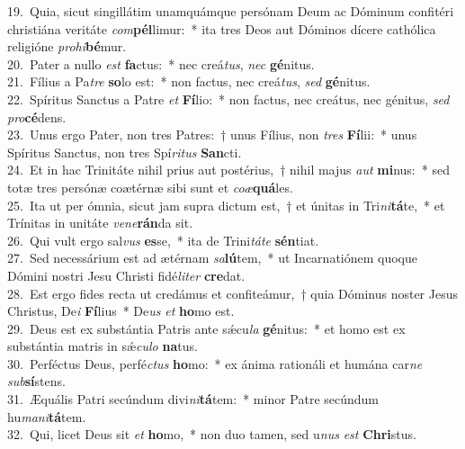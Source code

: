 {19.~}Quia, sicut singillátim unamquámque persónam Deum ac Dóminum confitéri christiána veritáte \textit{com}\textbf{pél}limur:~* ita tres Deos aut Dóminos dícere cathólica religióne \textit{pro}\textit{hi}\textbf{bé}mur.\\
{20.~}Pater a nullo \textit{est} \textbf{fa}ctus:~* nec creá\textit{tus}, \textit{nec} \textbf{gé}nitus.\\
{21.~}Fílius a Pa\textit{tre} \textbf{so}lo est:~* non factus, nec creá\textit{tus}, \textit{sed} \textbf{gé}nitus.\\
{22.~}Spíritus Sanctus a Patre \textit{et} \textbf{Fí}lio:~* non factus, nec creátus, nec génitus, \textit{sed} \textit{pro}\textbf{cé}dens.\\
{23.~}Unus ergo Pater, non tres Patres:~† unus Fílius, non \textit{tres} \textbf{Fí}lii:~* unus Spíritus Sanctus, non tres Spí\textit{ri}\textit{tus} \textbf{San}cti.\\
{24.~}Et in hac Trinitáte nihil prius aut postérius,~† nihil majus \textit{aut} \textbf{mi}nus:~* sed totæ tres persónæ coætérnæ sibi sunt et \textit{co}\textit{æ}\textbf{quá}les.\\
{25.~}Ita ut per ómnia, sicut jam supra dictum est,~† et únitas in Tri\textit{ni}\textbf{tá}te,~* et Trínitas in unitáte \textit{ve}\textit{ne}\textbf{rán}da sit.\\
{26.~}Qui vult ergo sal\textit{vus} \textbf{es}se,~* ita de Trini\textit{tá}\textit{te} \textbf{sén}tiat.\\
{27.~}Sed necessárium est ad ætérnam \textit{sa}\textbf{lú}tem,~* ut Incarnatiónem quoque Dómini nostri Jesu Christi fidé\textit{li}\textit{ter} \textbf{cre}dat.\\
{28.~}Est ergo fides recta ut credámus et confiteámur,~† quia Dóminus noster Jesus Christus, De\textit{i} \textbf{Fí}lius~* De\textit{us} \textit{et} \textbf{ho}mo est.\\
{29.~}Deus est ex substántia Patris ante sǽcu\textit{la} \textbf{gé}nitus:~* et homo est ex substántia matris in sǽ\textit{cu}\textit{lo} \textbf{na}tus.\\
{30.~}Perféctus Deus, perfé\textit{ctus} \textbf{ho}mo:~* ex ánima rationáli et humána car\textit{ne} \textit{sub}\textbf{sí}stens.\\
{31.~}Æquális Patri secúndum divi\textit{ni}\textbf{tá}tem:~* minor Patre secúndum hu\textit{ma}\textit{ni}\textbf{tá}tem.\\
{32.~}Qui, licet Deus sit \textit{et} \textbf{ho}mo,~* non duo tamen, sed u\textit{nus} \textit{est} \textbf{Chri}stus.\\
